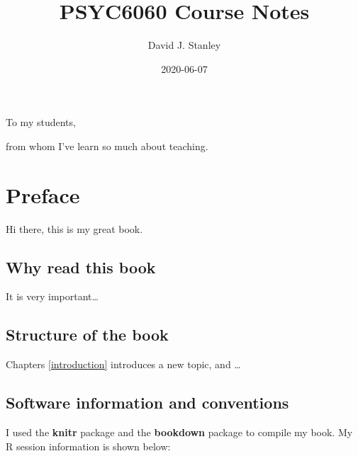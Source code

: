 \documentclass[
]{krantz}
\title{PSYC6060 Course Notes}
\author{David J. Stanley}
\date{2020-06-07}
\begin{document}
\maketitle


\thispagestyle{empty}

\begin{center}
To my students,

from whom I've learn so much about teaching.
\end{center}

\setlength{\abovedisplayskip}{-5pt}
\setlength{\abovedisplayshortskip}{-5pt}

{
\hypersetup{linkcolor=}
\setcounter{tocdepth}{2}
\tableofcontents
}
\listoftables
\listoffigures
\hypertarget{preface}{%
\chapter*{Preface}\label{preface}}


Hi there, this is my great book.

\hypertarget{why-read-this-book}{%
\section*{Why read this book}\label{why-read-this-book}}


It is very important\ldots{}

\hypertarget{structure-of-the-book}{%
\section*{Structure of the book}\label{structure-of-the-book}}


Chapters \ref{introduction} introduces a new topic, and \ldots{}

\hypertarget{software-information-and-conventions}{%
\section*{Software information and conventions}\label{software-information-and-conventions}}


I used the \textbf{knitr} package \citep{xie2015} and the \textbf{bookdown} package \citep{R-bookdown} to compile my book. My R session information is shown below:
\end{document}
